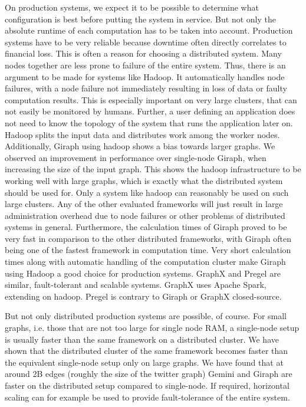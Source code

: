 On production systems, we expect it to be possible to determine what configuration is best before putting the system in service.
But not only the absolute runtime of each computation has to be taken into account. Production systems have to be very reliable because downtime often directly correlates to financial loss.
This is often a reason for choosing a distributed system. Many nodes together are less prone to failure of the entire system.
Thus, there is an argument to be made for systems like Hadoop.
It automatically handles node failures, with a node failure not immediately resulting in loss of data or faulty computation results.
This is especially important on very large clusters, that can not easily be monitored by humans.
Further, a user defining an application does not need to know the topology of the system that runs the application later on.
Hadoop splits the input data and distributes work among the worker nodes.
Additionally, Giraph using hadoop shows a bias towards larger graphs. We observed an improvement in performance over single-node Giraph, when increasing the size of the input graph.
This shows the hadoop infrastructure to be working well with large graphs, which is exactly what the distributed system should be used for. 
Only a system like hadoop can reasonably be used on such large clusters.
Any of the other evaluated frameworks will just result in large administration overhead due to node failures or other problems of distributed systems in general.
Furthermore, the calculation times of Giraph proved to be very fast in comparison to the other distributed frameworks, with Giraph often being one of the fastest framework in computation time.
Very short calculation times along with automatic handling of the computation cluster make Giraph using Hadoop a good choice for production systems.
GraphX and Pregel are similar, fault-tolerant and scalable systems. GraphX uses Apache Spark, extending on hadoop. Pregel is contrary to Giraph or GraphX closed-source.

But not only distributed production systems are possible, of course. 
For small graphs, i.e. those that are not too large for single node RAM, a single-node setup is usually faster than the same framework on a distributed cluster. 
We have shown that the distributed cluster of the same framework becomes faster than the equivalent single-node setup only on large graphs.
We have found that at around 2B edges (roughly the size of the twitter graph) Gemini and Giraph are faster on the distributed setup compared to single-node.
If required, horizontal scaling can for example be used to provide fault-tolerance of the entire system.

